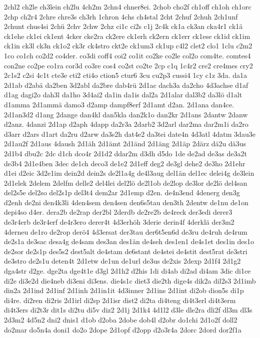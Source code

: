 {2chl2
ch2le
ch3lein
ch2lu
4ch2m
2chn4
chner8ei.
2chob
cho2f
ch1off
ch1oh
ch1orc
2chp
ch2r4
2chre
chre3s
ch3rh
1chron
4chs
ch4stal
2cht
2chuf
2chuh
2ch1unf
2chunt
chus4si
2chü
2chv
2chw
2chz
ci1c
ci2s
c1j
2c4k
ck1a
ck3an
cka4r1
ck1ä
ck1ehe
ck1ei
ck1ent
4cker
cke2ra
ck2ere
ck1erh
ck2ern
ck1err
ck1ese
ck1id
ck1im
ck1in
ck3l
ck3n
ck1o2
ck3r
ck4stro
ckt2e
ck1um3
ck1up
c4l2
clet2
clo1
1clu
c2m2
1co
co1ch
co2d2
co4der.
co3di
coff4
coi2
co1it
co2ke
co2le
col2o
com4te.
comtes4
con2ne
co2pe
co1ra
cor3d
co3re
cos4
co2st
co2te
2cp
c1q
1c4r2
cre2
cre4mes
cry2
2c1s2
c2si
4c1t
cte3e
cti2
cti4o
ction5
ctur6
3cu
cu2p3
cussi4
1cy
c1z
3da.
da1a
2d1ab
d2abä
da2ben
3d2abl
da2bre
dab4rü
2d1ac
dach3a
da2cho
4d3achse
d1af
d1ag
dagi2o
dah3l
da1ho
3d4ai2
da1in
da1is
dal2a
2d1alar
dal3b2
da3lö
d1alt
d1amma
2d1ammä
damo3
d2amp
dampf8erf
2d1amt
d2an.
2d1ana
dan4ce.
2d1an3d2
d1ang
2dange
dan4kl
dan5kla
dan2k1o
dan2kr
2d1ans
2dantw
2danw
d2anz.
4danzi
2d1ap
d2aph
4dapp
da2r3a
2darb2
3d2arl
dar2ma
dar2m1i
da2ro
d3arr
d2ars
d1art
da2ru
d2arw
da3s2h
dat4e2
da3tei
date4n
4d3atl
4datm
3dau3e
2d1au2f
2d1aus
4daush
2d1äh
2d1ämt
2d1änd
2d1äng
2d1äp
2därz
dä2u
dä3us
2d1b4
dbu2c
2dc
d1ch
dco4r
2d1d2
ddar2m
d3dh
d5do
1de
de2ad
de3as
de3a2t
de3b4
2d1e4ben
3dec
de1ch
deco3
de1e2
2d1eff
deg2
de3gl
dehe2
de3ho
2d1ehr
d1ei
d2eic
3d2e1im
dein2d
dein2s
de2l1a4g
de4l3aug
del1än
del1ec
delei4g
de3lein
2d1elek
2delem
2delfm
delle2
del4lei
del2lö
de2l1ob
de2lop
de3lor
de2lö
del4san
del2s5e
del2so
del2s1p
del3t4
dem2ar
2d1emp
d2en.
de4n3end
4denerg
den3g
d2enh
de2ni
den4k3li
4den4sem
den4sen
den6s5tau
den3th
2dentw
de1nu
de1on
depi4so
d4er.
dera2b
de2rap
der2bl
2derdb
de2re2b
de4reck
der3edi
derer3
de3r4erb
de3r4erf
de4r3ero
derer4t
4d3erhöh
3derie
derin4f
4derklä
der3m2
4derneu
de1ro
de2rop
derö4
4d3ersat
der3tau
der6t5en6d
de3ru
de4ruh
de4rum
de2s1a
de3sac
desa4g
de4sam
des3an
des1än
de4seh
des1en1
de4s1et
des1in
des1o
de2sor
de2s1p
des5s2
dest5alt
de4stam
de6stant
de4stei
de4stit
dest5rat
de3stri
de3stro
de2s1u
deten4t
2d1etw
de1un
de1url
de3us
de2xis
2dexp
2d1f4
2d1g2
dga4str
d2ge.
dge2ta
dge4t1e
d3gl
2d1h2
d2his
1di
di4ab
di2ad
di4am
3dic
di1ce
di2e
di3e2d
die4neb
di3eni
di3ens.
die4s1c
diet3
die2th
dige4s
dik2a
dil2s3
2d1imb
din2a
2d1ind
2d1inf
2d1inh
2d1in1it
4d3inner
2d1ins
2d1int
di2ob
dion5s
di1p
di4re.
di2ren
di2ris
2d1irl
di2sp
2d1isr
dist2
di2ta
di4teng
di4t3erl
di4t3erm
di4t3ers
di2t3r
dit1s
di2tu
di5v
diz2
2d1j
2d1k4
4d1l2
d3le
dle2ra
dli2f
dl3m
dl3s
2d3m2
4d5n2
dni2
dnis1
d1ob
d2oba
2dobe
dob4l
d2obr
do1chi
2d1o2f
doll2
do2mar
do5n4a
doni1
do2o
2dope
2d1opf
d2opp
d2o3r4a
2dorc
2dord
dor2f1a
}
